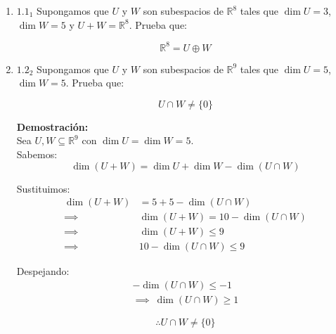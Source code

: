 \documentclass{article}
\begin{document}
		\begin{enumerate}
			
			
			\item \(1.1_1\) 
			Supongamos que \(U\) y \(W\) son subespacios de \(\mathbb{R}^8\) tales que \(\dim U=3\), \(\dim W=5\) y \(U+W=\mathbb{R}^8\). Prueba que:
			
			\begin{equation*}
				\mathbb{R}^8 = U \oplus W
			\end{equation*}
			
			
			\item \(1.2_2\) 
			Supongamos que \(U\) y \(W\) son subespacios de \(\mathbb{R}^9\) tales que \(\dim U=5\), \(\dim W=5\). Prueba que:
			
			\begin{equation*}
				U \cap W \neq \{0\}
			\end{equation*}
			
			\textbf{Demostración:}\\
			
			Sea \( U, W \subseteq \mathbb{R}^9\) con \(\dim U = \dim W = 5\).\\
			
			Sabemos:
			\begin{equation*}
				\dim(U+W) = \dim U + \dim W - \dim(U \cap W)
			\end{equation*}
			
			Sustituimos:
			\begin{equation*}
				\begin{aligned}
					\dim(U+W) &= 5 + 5 - \dim(U \cap W) \\
					\implies\ & \dim(U+W) = 10 - \dim(U \cap W) \\
					\implies\ & \dim(U+W) \leq 9 \\
					\implies\ & 10 - \dim(U \cap W) \leq 9
				\end{aligned}
			\end{equation*}
			
			Despejando:
			\begin{equation*}
				\begin{aligned}
					-\dim(U \cap W) \le -1 \\
					\implies\  \dim(U \cap W) \ge 1
				\end{aligned}
			\end{equation*}
			
			\begin{equation*}
				\boxed{\therefore U \cap W \neq \{0\}}
			\end{equation*}
			
		\end{enumerate}
		
\end{document}
